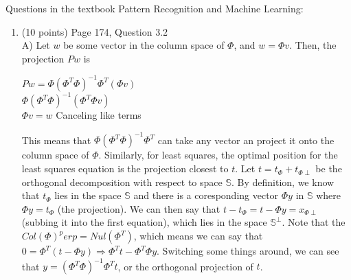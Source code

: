 \documentclass[11pt]{article}
\begin{document}
Questions in the textbook Pattern Recognition and Machine Learning:
\begin{enumerate}
\item (10 points) Page 174, Question 3.2 \\
A) Let $w$ be some vector in the column space of $\Phi$, and $w = \Phi v$. Then, the projection $Pw$ is
\begin{center}
      $Pw = \Phi (\Phi^T\Phi)^{-1}\Phi^T (\Phi v)$\\
      $\Phi (\Phi^T\Phi)^{-1}(\Phi^T \Phi v)$\\
      $\Phi v = w$ Canceling like terms
\end{center}
This means that $\Phi (\Phi^T\Phi)^{-1}\Phi^T$ can take any vector an project it onto the column space of $\Phi$.
Similarly, for least squares, the optimal position for the least squares equation is the projection closest to $t$.
Let $t = t_\Phi + t_{\Phi \perp}$ be the orthogonal decomposition with respect to space $\mathbb{S}$. By definition,
we know that $t_\Phi$ lies in the space $\mathbb{S}$ and there is a coresponding vector $\Phi y$ in $\mathbb{S}$ where
$\Phi y = t_\Phi$ (the projection). We can then say that $t - t_\Phi = t - \Phi y = x_{\Phi \perp}$ (subbing it into the first equation),
which lies in the space $\mathbb{S}^\perp$. Note that the $Col(\Phi)^perp = Nul(\Phi^T)$, which means we can say that 
$0 = \Phi^T(t - \Phi y) \Rightarrow \Phi^T t - \Phi^T \Phi y$. Switching some things around, we can see that 
$y = (\Phi^T \Phi)^{-1}\Phi^T t$, or the orthogonal projection of $t$.


\end{enumerate}
\end{document}
